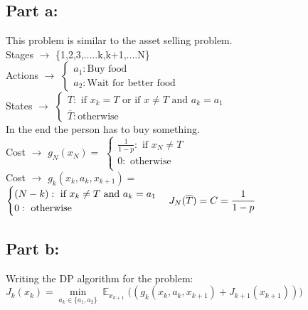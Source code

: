 \documentclass{article}
\begin{document}
\subsection{Part a:}
This problem is similar to the asset selling problem.\\
Stages $\rightarrow $ \{1,2,3,.....k,k+1,....N\}\\
Actions $\rightarrow $ 
$
\begin{cases}
  a_1: \textrm{Buy food}\\    
  a_2: \textrm{Wait for better food}    
\end{cases}
$\\
States $\rightarrow $ 
$
\begin{cases}
  T: \textrm{ if } x_k=T \textrm{ or if } x \neq T \textrm{ and } a_k=a_1\\    
  \overline{T}: \textrm{otherwise}    
\end{cases}
$\\
In the end the person has to buy something.\\
Cost $\rightarrow $ $g_N(x_N)=$ 
$
\begin{cases}
  \frac{1}{1-p}: \textrm{ if } x_N \neq T\\    
  0: \textrm{ otherwise }\\
\end{cases}
$\\
Cost $\rightarrow $ $g_k(x_k,a_k,x_{k+1})=$ 
$
\begin{cases}
  (N-k): \textrm{ if } x_k \neq T \textrm{ and } a_k=a_1\\    
  0: \textrm{ otherwise }\\
\end{cases}\\
J_N(\overline T)=C=\dfrac{1}{1-p}
$\\

\subsection{Part b:}
Writing the DP algorithm for the problem:\\
$J_k(x_k)= \min\limits_{a_k \in \{a_1,a_2\}} \displaystyle \mathop{\mathbb{E}}_{x_{k+1}} \big( (g_k(x_k,a_k,x_{k+1})+J_{k+1}(x_{k+1}))\big)$\\
\end{document}
